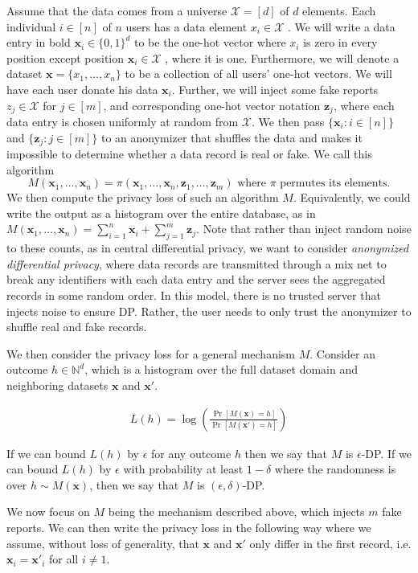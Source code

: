 \documentclass[11pt]{article}
\newcommand{\bbx}{\pmb{x}}
\newcommand{\bbz}{\pmb{z}}
\newcommand{\cX}{\mathcal{X}}
\newcommand{\N}{\mathbb{N}}
\begin{document}
Assume that the data comes from a universe $\cX = [d]$ of $d$ elements. Each individual $i \in [n]$ of $n$ users has a data element $x_i\in \cX$ . We will write a data entry in bold $\bbx_i \in \{0, 1\}^d $ to be the one-hot vector where $x_i$ is zero in every position except position $\bbx_i \in \cX$ , where it is one. Furthermore, we will denote a dataset $\bbx = \{x_1,\dots ,x_n\}$ to be a collection of all users' one-hot vectors. We will have each user donate his data $\bbx_i$. Further, we will inject some fake reports $z_j\in \cX$ for $j \in [m]$, and corresponding one-hot vector notation $\bbz_j$, where each data entry is chosen uniformly at random from $\cX$. We then pass $\{\bbx_i : i \in [n]\}$ and $\{\bbz_j : j \in [m]\} $ to an anonymizer that shuffles the data and makes it impossible to determine whether a data record is real or fake. We call this algorithm 
\[
M(\bbx_1,  \dots , \bbx_n) = \pi (\bbx_1, \dots , \bbx_n, \bbz_1, \dots , \bbz_m) \text{ where } \pi \text{ permutes its elements}. 
\]
We then compute the privacy loss of such an algorithm $M$. Equivalently, we could write the output as a histogram over the entire database, as in $M(\bbx_1,  \dots , \bbx_n) = \sum^n_{i=1} \bbx_i + \sum^m_{j=1} \bbz_j$. Note that rather than inject random noise to these counts, as in central differential privacy, we want to consider \emph{anonymized differential privacy}, where data records are transmitted through a mix net to break any identifiers with each data entry and the server sees the aggregated records in some random order. In this model, there is no trusted server that injects noise to ensure DP. Rather, the user needs to only trust the anonymizer to shuffle real and fake records.

We then consider the privacy loss for a general mechanism $M$. Consider an outcome $h \in \N^d$, which is a histogram over the full dataset domain and neighboring datasets $\bbx$ and $\bbx'$.

\begin{align}
L(h) = \log \left ( \frac{\Pr[M(\bbx) = h]}{\Pr[M(\bbx') = h]} \right )
\end{align}

If we can bound $L(h)$ by $\epsilon$ for any outcome $h$ then we say that $M$ is $\epsilon$-DP. If we can bound $L(h)$ by $\epsilon$ with probability at least $1 - \delta$ where the randomness is over $h \sim M(\bbx)$, then we say that $M$ is $(\epsilon, \delta)$-DP.

We now focus on $M$ being the mechanism described above, which injects $m$ fake reports. We can then write the privacy loss in the following way where we assume, without loss of generality, that $\bbx$ and $\bbx'$ only differ in the first record, i.e. $\bbx_i = \bbx'_i$ for all $i \ne 1$.
\end{document}
